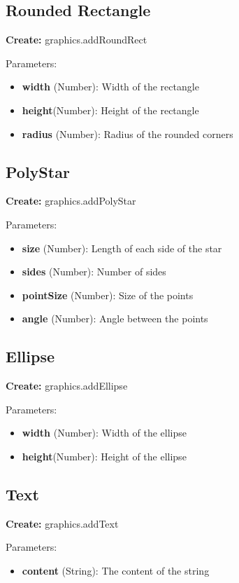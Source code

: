 \documentclass{article}
\begin{document}
\subsection{Rounded Rectangle}
\textbf{Create:} graphics.addRoundRect

Parameters:
\begin{itemize}
\item \textbf{width} (Number): Width of the rectangle
\item \textbf{height}(Number): Height of the rectangle
\item \textbf{radius} (Number): Radius of the rounded corners
\end{itemize}

\subsection{PolyStar}
\textbf{Create:} graphics.addPolyStar

Parameters:
\begin{itemize}
\item \textbf{size} (Number): Length of each side of the star
\item \textbf{sides} (Number): Number of sides
\item \textbf{pointSize} (Number): Size of the points
\item \textbf{angle} (Number): Angle between the points
\end{itemize}

\subsection{Ellipse}
\textbf{Create:} graphics.addEllipse

Parameters:
\begin{itemize}
\item \textbf{width} (Number): Width of the ellipse
\item \textbf{height}(Number): Height of the ellipse
\end{itemize}

\subsection{Text}
\textbf{Create:} graphics.addText

Parameters:
\begin{itemize}
\item \textbf{content} (String): The content of the string
\end{itemize}
\end{document}

